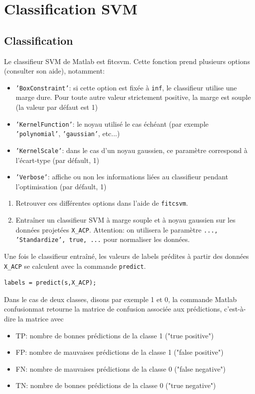\section{Classification SVM}

\subsection{Classification}

Le classifieur SVM de Matlab est fitcsvm. Cette fonction prend plusieurs options (consulter son aide), notamment:
\begin{itemize}[label=-]
	\item \texttt{'BoxConstraint'}: si cette option est fixée à \texttt{inf}, le classifieur utilise une marge dure. Pour toute autre valeur strictement positive, la marge est souple (la valeur par défaut est 1)
	\item \texttt{'KernelFunction'}: le noyau utilisé le cas échéant (par exemple \texttt{'polynomial'}, \texttt{'gaussian'}, etc...)
	\item \texttt{'KernelScale'}: dans le cas d'un noyau gaussien, ce paramètre correspond à l'écart-type (par défault, 1)
	\item \texttt{'Verbose'}: affiche ou non les informations liées au classifieur pendant l'optimisation (par défault, 1)
\end{itemize}

\begin{enumerate}
	\item Retrouver ces différentes options dans l'aide de \texttt{fitcsvm}.
	\item Entraîner un classifieur SVM à marge souple et à noyau gaussien sur les données projetées \texttt{X\_ACP}. Attention: on utilisera le paramètre \texttt{..., 'Standardize', true, ...} pour normaliser les données.
\end{enumerate}

Une fois le classifieur entraîné, les valeurs de labels prédites à partir des données \texttt{X\_ACP} se calculent avec la commande \texttt{predict}.
\begin{lstlisting}
labels = predict(s,X_ACP);
\end{lstlisting}

Dans le cas de deux classes, disons par exemple 1 et 0, la commande Matlab confusionmat retourne la matrice de confusion associée aux prédictions, c'est-à-dire la matrice  avec
\begin{itemize}[label=-]
	\item TP: nombre de bonnes prédictions de la classe 1 ("true positive")
	\item FP: nombre de mauvaises prédictions de la classe 1 ("false positive")
	\item FN: nombre de mauvaises prédictions de la classe 0  ("false negative")
	\item TN: nombre de bonnes prédictions de la classe 0 ("true negative")
\end{itemize}

